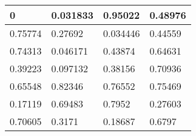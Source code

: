 \begin{tabular}{|l|l|l|l|}
\hline
0&0.031833&0.95022&0.48976\\\hline
0.75774&0.27692&0.034446&0.44559\\\hline
0.74313&0.046171&0.43874&0.64631\\\hline
0.39223&0.097132&0.38156&0.70936\\\hline
0.65548&0.82346&0.76552&0.75469\\\hline
0.17119&0.69483&0.7952&0.27603\\\hline
0.70605&0.3171&0.18687&0.6797\\\hline
\end{tabular}
